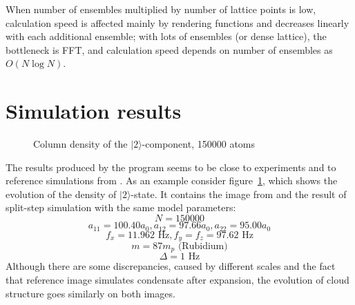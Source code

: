 \documentclass[12pt,notitlepage]{report}
\begin{document}
When number of ensembles multiplied by number of lattice points is low,
calculation speed is affected mainly by rendering functions and decreases linearly with each additional ensemble;
with lots of ensembles (or dense lattice), the bottleneck is FFT,
and calculation speed depends on number of ensembles as $O(N\log{N})$.

\section*{Simulation results}

\begin{figure}
\begin{center}
\qquad
{}
\end{center}
\caption{Column density of the $\vert2\rangle$-component, 150000 atoms}
\label{evolution_vs_reference}
\end{figure}

The results produced by the program seems to be close to experiments and to reference simulations from \cite{anderson-2009-80}.
As an example consider figure~\ref{evolution_vs_reference},
which shows the evolution of the density of $\vert2\rangle$-state.
It contains the image from \cite{anderson-2009-80} and the result of split-step simulation with the same model parameters:
\[ N = 150000 \]
\[ a_{11} = 100.40 a_0, a_{12} = 97.66 a_0, a_{22} = 95.00 a_0 \]
\[ f_x = 11.962 \textrm{ Hz}, f_y = f_z = 97.62 \textrm{ Hz} \]
\[ m = 87 m_p \textrm{ (Rubidium)}\]
\[ \Delta = 1 \textrm{ Hz} \]
Although there are some discrepancies,
caused by different scales and the fact that reference image simulates condensate after expansion,
the evolution of cloud structure goes similarly on both images.
\end{document}
